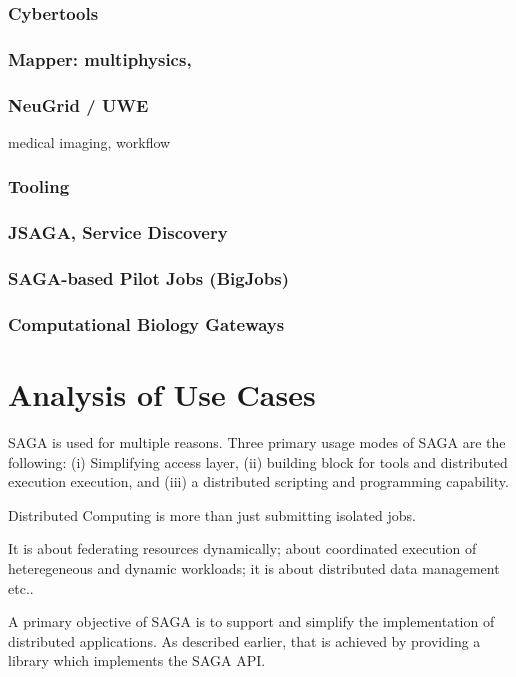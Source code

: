 \documentclass[12pt]{article}
\begin{document}
\subsubsection*{Cybertools} 
\subsubsection*{Mapper: multiphysics,}
\subsubsection*{NeuGrid / UWE} medical imaging, workflow

\subsubsection{Tooling}
   \subsubsection*{JSAGA, Service Discovery}
   \subsubsection*{SAGA-based Pilot Jobs (BigJobs)}
   \subsubsection*{Computational Biology Gateways}

\section{Analysis of Use Cases}

SAGA is used for multiple reasons. Three primary usage modes of SAGA
are the following: (i) Simplifying access layer, (ii) building block
for tools and distributed execution execution, and (iii) a distributed
scripting and programming capability.

Distributed Computing is more than just submitting isolated jobs.

It is about federating resources dynamically; about coordinated
execution of heteregeneous and dynamic workloads; it is about
distributed data management etc..

A primary objective of SAGA is to support and simplify the
implementation of distributed applications.  As described earlier,
that is achieved by providing a library which implements the SAGA API.
\end{document}

